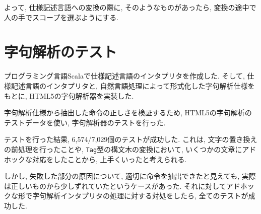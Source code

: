 \documentclass[10pt,twocolumn,uplatex,a4j]{jsreport}
\begin{document}
よって, 仕様記述言語への変換の際に, 
そのようなものがあったら, 変換の途中で人の手でスコープを選ぶようにする. 

\section{字句解析のテスト}
プログラミング言語Scalaで仕様記述言語のインタプリタを作成した. %
そして, 仕様記述言語のインタプリタと, 自然言語処理によって形式化した字句解析仕様をもとに, HTML5の字句解析器を実装した. 

字句解析仕様から抽出した命令の正しさを検証するため, HTML5の字句解析のテストデータを使い, 字句解析器のテストを行った. 

テストを行った結果, 6,574/7,029個のテストが成功した. 
これは, 文字の置き換えの前処理を行ったことや, \texttt{Tag}型の構文木の変換において, いくつかの文章にアドホックな対応をしたことから, 上手くいったと考えられる. 

しかし, 失敗した部分の原因について, 適切に命令を抽出できたと見えても, 実際は正しいものから少しずれていたというケースがあった. %
それに対してアドホックな形で字句解析インタプリタの処理に対する対処をしたら, 全てのテストが成功した. 



\end{document}

